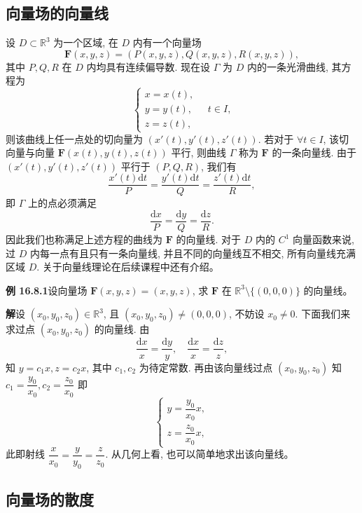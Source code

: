 \documentclass[UTF8,12pt,a4paper,fontset=fandol]{ctexart}
\begin{document}
\subsection{向量场的向量线}

设 $D\subset\mathbb R^3$ 为一个区域, 在 $D$ 内有一个向量场
\[
  \boldsymbol F(x,y,z)=(P(x,y,z),Q(x,y,z),R(x,y,z)),
\]
其中 $P,Q,R$ 在 $D$ 内均具有连续偏导数. 现在设 $\Gamma$ 为 $D$ 内的一条光滑曲线, 其方程为
\[
  \begin{cases}
    x=x(t),\\
    y=y(t),\\
    z=z(t),
  \end{cases}\quad t\in I,
\]
则该曲线上任一点处的切向量为 $(x'(t),y'(t),z'(t))$. 若对于 $\forall t\in I$, 该切向量与向量 $\boldsymbol F(x(t),y(t),z(t))$ 平行, 则曲线 $\Gamma$ 称为 $\boldsymbol F$ 的一条向量线. 由于 $(x'(t),y'(t),z'(t))$ 平行于 $(P,Q,R)$, 我们有
\[
  \frac{x'(t)\mathrm dt}{P}=\frac{y'(t)\mathrm dt}{Q}=\frac{z'(t)\mathrm dt}{R},
\]
即 $\Gamma$ 上的点必须满足
\[
  \frac{\mathrm dx}{P}=\frac{\mathrm dy}{Q}=\frac{\mathrm dz}{R}.
\]
因此我们也称满足上述方程的曲线为 $\boldsymbol F$ 的向量线. 对于 $D$ 内的 $C^1$ 向量函数来说, 过 $D$ 内每一点有且只有一条向量线, 并且不同的向量线互不相交, 所有向量线充满区域 $D$. 关于向量线理论在后续课程中还有介绍。

\noindent\textbf{例 16.8.1}\quad 设向量场 $\boldsymbol F(x,y,z)=(x,y,z)$, 求 $\boldsymbol F$ 在 $\mathbb R^3\setminus\{(0,0,0)\}$ 的向量线。

\noindent\textbf{解}\quad 设 $(x_0,y_0,z_0)\in\mathbb R^3$, 且 $(x_0,y_0,z_0)\ne(0,0,0)$, 不妨设 $x_0\ne0$. 下面我们来求过点 $(x_0,y_0,z_0)$ 的向量线. 由
\[
  \frac{\mathrm dx}{x}=\frac{\mathrm dy}{y},\quad
  \frac{\mathrm dx}{x}=\frac{\mathrm dz}{z},
\]
知 $y=c_1x,z=c_2x$, 其中 $c_1,c_2$ 为待定常数. 再由该向量线过点 $(x_0,y_0,z_0)$ 知 $c_1=\dfrac{y_0}{x_0},c_2=\dfrac{z_0}{x_0}$ 即
\[
  \begin{cases}
    y=\dfrac{y_0}{x_0}x,\\
    z=\dfrac{z_0}{x_0}x,
  \end{cases}
\]
此即射线 $\dfrac{x}{x_0}=\dfrac{y}{y_0}=\dfrac{z}{z_0}$. 从几何上看, 也可以简单地求出该向量线。

\subsection{向量场的散度}
\end{document}
